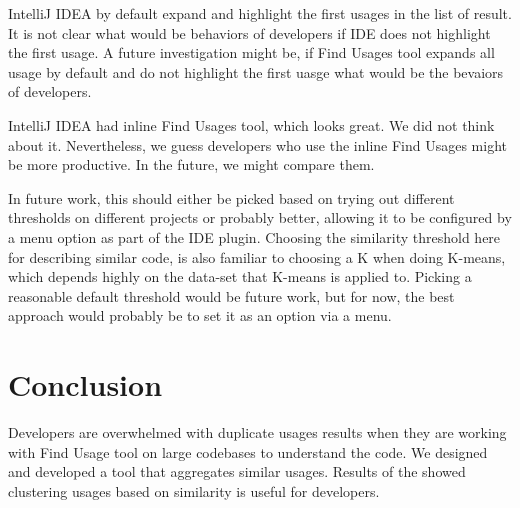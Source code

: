 \documentclass[conference]{IEEEtran}
\begin{document}
IntelliJ IDEA by default expand and highlight the first usages in the list of result. It is not clear what would be behaviors of developers if IDE does not highlight the first usage. A future investigation might be, if Find Usages tool expands all usage by default and do not highlight the first uasge what would be the bevaiors of developers.\par

IntelliJ IDEA had inline Find Usages tool, which looks great. We did not think about it. Nevertheless, we guess developers who use the inline Find Usages might be more productive. In the future, we might compare them. \par

In future work, this should either be picked based on trying out different thresholds on different projects or probably better, allowing it to be configured by a menu option as part of the IDE plugin. Choosing the similarity threshold here for describing similar code, is also familiar to choosing a K when doing K-means, which depends highly on the data-set that K-means is applied to. Picking a reasonable default threshold would be future work, but for now, the best approach would probably be to set it as an option via a menu.

\section{Conclusion}
Developers are overwhelmed with duplicate usages results when they are working with Find Usage tool on large codebases to understand the code. We designed and developed a tool that aggregates similar usages. Results of the showed clustering usages based on similarity is useful for developers.




\end{document}
